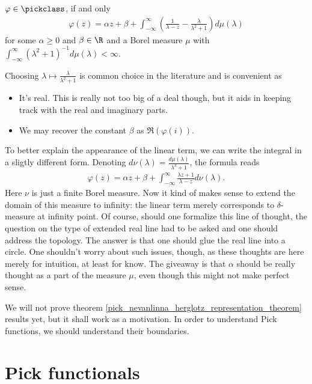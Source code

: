 \begin{lause}\label{pick_nevanlinna_herglotz_representation_theorem}
	$\varphi \in \pickclass$, if and only
	\begin{align}\label{pick_representation}
		\varphi(z) = \alpha z + \beta + \int_{-\infty}^{\infty} \left(\frac{1}{\lambda - z} - \frac{\lambda}{\lambda^2 + 1}\right) d \mu(\lambda)
	\end{align}
	for some $\alpha \geq 0$ and $\beta \in \R$ and a Borel measure $\mu$ with $\int_{-\infty}^{\infty} (\lambda^2 + 1)^{-1} d \mu(\lambda) < \infty$.
\end{lause}

Choosing $\lambda \mapsto \frac{\lambda}{\lambda^2 + 1}$ is common choice in the literature and is convenient as
\begin{itemize}
	\item It's real. This is really not too big of a deal though, but it aids in keeping track with the real and imaginary parts.
	\item We may recover the constant $\beta$ as $\Re(\varphi(i))$.
\end{itemize}

To better explain the appearance of the linear term, we can write the integral in a sligtly different form. Denoting $d \nu(\lambda) = \frac{d \mu(\lambda)}{\lambda^2 + 1}$, the formula reads
\begin{align*}
	\varphi(z) = \alpha z + \beta + \int_{-\infty}^{\infty} \frac{\lambda z + 1}{\lambda - z} d \nu(\lambda).
\end{align*}
Here $\nu$ is just a finite Borel measure. Now it kind of makes sense to extend the domain of this measure to infinity: the linear term merely corresponds to $\delta$-measure at infinity point. Of course, should one formalize this line of thought, the question on the type of extended real line had to be asked and one should address the topology. The answer is that one should glue the real line into a circle. One shouldn't worry about such issues, though, as these thoughts are here merely for intuition, at least for know. The giveaway is that $\alpha$ should be really thought as a part of the measure $\mu$, even though this might not make perfect sense.

We will not prove theorem \ref{pick_nevanlinna_herglotz_representation_theorem} results yet, but it shall work as a motivation. In order to understand Pick functions, we should understand their boundaries.

\section{Pick functionals}

